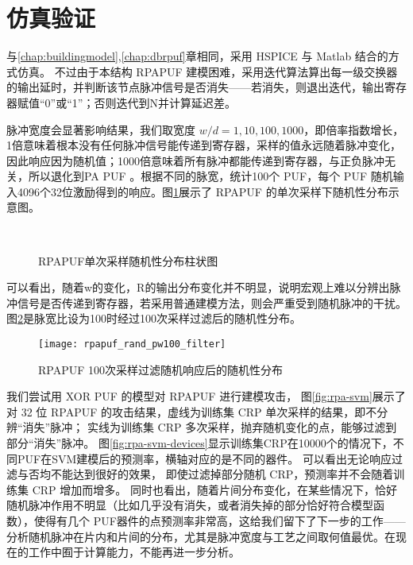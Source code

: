 \section{仿真验证}\label{sec:rpa_simu}
与\ref{chap:buildingmodel},\ref{chap:dbrpuf}章相同，采用 HSPICE 与 Matlab 结合的方式仿真。
不过由于本结构 RPAPUF 建模困难，采用迭代算法算出每一级交换器的输出延时，并判断该节点脉冲信号是否消失——若消失，则退出迭代，输出寄存器赋值``0''或``1''；否则迭代到N并计算延迟差。

脉冲宽度会显著影响结果，我们取宽度 $ w/d={1,10,100,1000} $，即倍率指数增长，1倍意味着根本没有任何脉冲信号能传递到寄存器，采样的值永远随着脉冲变化，因此响应因为随机值；1000倍意味着所有脉冲都能传递到寄存器，与正负脉冲无关，所以退化到PA PUF 。根据不同的脉宽，统计100个 PUF，每个 PUF 随机输入4096个32位激励得到的响应。图\ref{fig:rpa-single-rand}展示了 RPAPUF 的单次采样下随机性分布示意图。

\begin{figure}[htb!]
\centering
{}
\\
\caption{RPAPUF单次采样随机性分布柱状图}
\label{fig:rpa-single-rand}
\end{figure}

可以看出，随着w的变化，R的输出分布变化并不明显，说明宏观上难以分辨出脉冲信号是否传递到寄存器，若采用普通建模方法，则会严重受到随机脉冲的干扰。图\ref{fig:rpa-k100-rand}是脉宽比设为100时经过100次采样过滤后的随机性分布。

\begin{figure}[htb!]
\centering
\texttt{[image: rpapuf\_rand\_pw100\_filter]}
\caption{RPAPUF 100次采样过滤随机响应后的随机性分布}
\label{fig:rpa-k100-rand}
\end{figure}

我们尝试用 XOR PUF 的模型对 RPAPUF 进行建模攻击， 图\ref{fig:rpa-svm}展示了对 32 位 RPAPUF 的攻击结果，虚线为训练集 CRP 单次采样的结果，即不分辨``消失''脉冲；
实线为训练集 CRP 多次采样，抛弃随机变化的点，能够过滤到部分``消失''脉冲。
图\ref{fig:rpa-svm-devices}显示训练集CRP在10000个的情况下，不同PUF在SVM建模后的预测率，横轴对应的是不同的器件。
可以看出无论响应过滤与否均不能达到很好的效果， 即使过滤掉部分随机 CRP，预测率并不会随着训练集 CRP 增加而增多。
同时也看出，随着片间分布变化，在某些情况下，恰好随机脉冲作用不明显（比如几乎没有消失，或者消失掉的部分恰好符合模型函数），使得有几个 PUF器件的点预测率非常高，这给我们留下了下一步的工作——分析随机脉冲在片内和片间的分布，尤其是脉冲宽度与工艺之间取何值最优。在现在的工作中囿于计算能力，不能再进一步分析。

